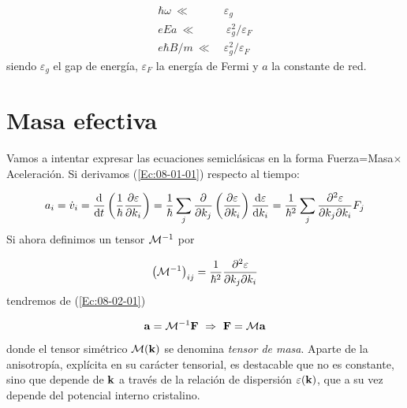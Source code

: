 \begin{equation}
	\begin{split}
	\hbar \omega \ \ll \ & \varepsilon_g \\
	e E a \ \ll & \ \varepsilon_g^2 / \varepsilon_F \\
	e\hbar B/m \ \ll \ & \varepsilon_g^2 / \varepsilon_F
	\end{split}
\end{equation}
siendo $\varepsilon_g$ el gap de energía, $\varepsilon_F$ la energía de Fermi y $a$ la constante de red.

\section{Masa efectiva}

Vamos a intentar expresar las ecuaciones semiclásicas en la forma Fuerza=Masa$\times$Aceleración. Si derivamos (\ref{Ec:08-01-01}) respecto al tiempo:

\begin{equation}
	a_i = \dot{v}_i  = \frac{\mathrm{d} }{\mathrm{d} t} \left( \frac{1}{\hbar} \frac{\partial \varepsilon}{\partial k_i} \right) = \frac{1}{\hbar} \sum_j \frac{\partial }{\partial k_j} \left( \frac{\partial \varepsilon}{\partial k_i} \right) \frac{\mathrm{d} \varepsilon}{\mathrm{d} k_i} = \frac{1}{\hbar^2} \sum_j \frac{\partial ^2 \varepsilon}{\partial k_j \partial k_i} F_j \label{Ec:08-02-01}
\end{equation}
Si ahora definimos un tensor $\mathcal{M}^{-1}$ por 

\begin{equation}
	\left( \mathcal{M}^{-1} \right)_{ij} = \frac{1}{\hbar^2} \frac{\partial ^2 \varepsilon}{\partial k_j \partial k_i}
\end{equation}
tendremos de (\ref{Ec:08-02-01}) 

\begin{equation}
	\mathbf{a} = \mathcal{M}^{-1} \mathbf{F} \ \Rightarrow \ \mathbf{F} = \mathcal{M} \mathbf{a}
\end{equation}
donde el tensor simétrico $\mathcal{M} (\mathbf{k})$ se denomina \textit{tensor de masa}. Aparte de la anisotropía, explícita en su carácter tensorial, es destacable que no es constante, sino que depende de $\mathbf{k}$ a través de la relación de dispersión $\varepsilon(\mathbf{k})$, que a su vez depende del potencial interno cristalino.

